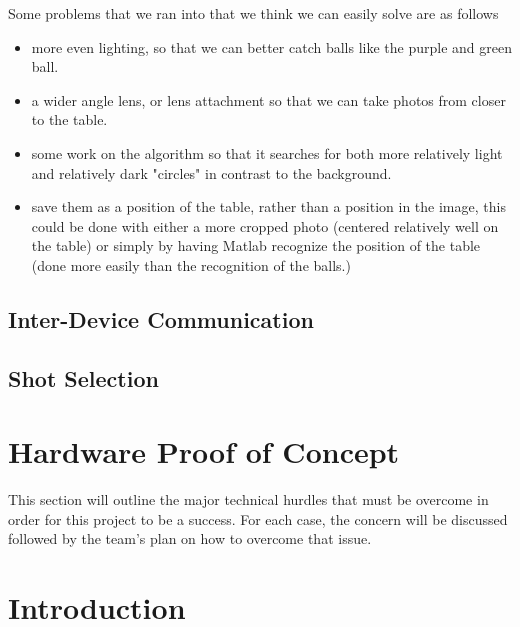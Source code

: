 \documentclass[titlepage]{article}
\begin{document}
Some problems that we ran into that we think we can easily solve are as follows
\begin{itemize}
\item more even lighting, so that we can better catch balls like the purple and green ball.
\item a wider angle lens, or lens attachment so that we can take photos from closer to the table.
\item some work on the algorithm so that it searches for both more relatively light and relatively dark "circles" in contrast to the background.
\item save them as a position of the table, rather than a position  in the image, this could be done with either a more cropped photo (centered relatively well on the table) or simply by having Matlab recognize the position of the table (done more easily than the recognition of the balls.) 
\end{itemize}


\subsection{Inter-Device Communication}

\subsection{Shot Selection}



\section{Hardware Proof of Concept}
This section will outline the major technical hurdles that must be overcome in order for this project to be a success. For each case, the concern will be discussed followed by the team's plan on how to overcome that issue.
 
\section{Introduction}
\end{document}
